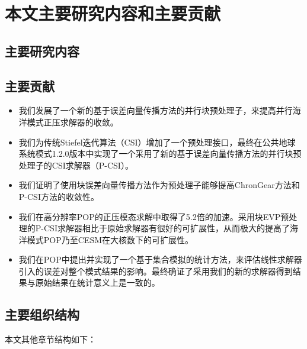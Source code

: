  





  



\section{本文主要研究内容和主要贡献}
\subsection{主要研究内容}
\subsection{主要贡献}
\begin{itemize}
\item  
我们发展了一个新的基于误差向量传播方法的并行块预处理子\cite{roache1995elliptic}，来提高并行海洋模式正压求解器的收敛。 
\item  
我们为传统Stiefel迭代算法（CSI）\cite{hu2013scalable}增加了一个预处理接口，最终在公共地球系统模式1.2.0版本中实现了一个采用了新的基于误差向量传播方法的并行块预处理子的CSI求解器（P-CSI）。
\item  
我们证明了使用块误差向量传播方法作为预处理子能够提高ChronGear方法和P-CSI方法的收敛性。 
\item  
我们在高分辨率POP的正压模态求解中取得了5.2倍的加速。采用块EVP预处理的P-CSI求解器相比于原始求解器有很好的可扩展性，从而极大的提高了海洋模式POP乃至CESM在大核数下的可扩展性。 
\item  
我们在POP中提出并实现了一个基于集合模拟的统计方法，来评估线性求解器引入的误差对整个模式结果的影响。最终确证了采用我们的新的求解器得到结果与原始结果在统计意义上是一致的。 
\end{itemize}
\subsection{主要组织结构}
本文其他章节结构如下：


